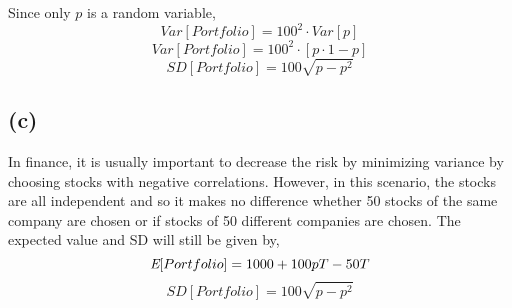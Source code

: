 \documentclass{article}
\begin{document}
			Since only $p$ is a random variable,
			$$ Var[Portfolio] = 100^2\cdot Var[p]$$
			$$ Var[Portfolio] = 100^2\cdot [p\cdot 1-p]$$
			$$ SD[Portfolio] = 100 \sqrt{p - p^2}$$
		\subsection*{(c)}
			In finance, it is usually important to decrease the risk by minimizing variance by choosing stocks with negative correlations. However, in this scenario, the stocks are all 					independent and so it makes no difference whether 50 stocks of the same company are chosen or if stocks of 50 different companies are chosen. The expected value and SD 				will still be given by,
			$$ \emph{E}[Portfolio] = 1000+ 100pT - 50T $$ 
			$$ SD[Portfolio] = 100 \sqrt{p - p^2}$$
	
\end{document}
